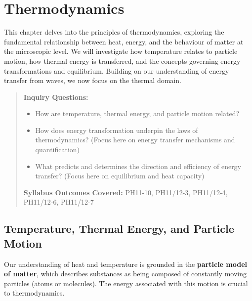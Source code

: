 
\chapter{Thermodynamics}
\label{ch:thermodynamics}
\FloatBarrier %

This chapter delves into the principles of thermodynamics, exploring the fundamental relationship between heat, energy, and the behaviour of matter at the microscopic level. We will investigate how temperature relates to particle motion, how thermal energy is transferred, and the concepts governing energy transformations and equilibrium. Building on our understanding of energy transfer from waves, we now focus on the thermal domain.

\blockquote{
\textbf{Inquiry Questions:}
\begin{itemize}
    \item How are temperature, thermal energy, and particle motion related?
    \item How does energy transformation underpin the laws of thermodynamics? (Focus here on energy transfer mechanisms and quantification)
    \item What predicts and determines the direction and efficiency of energy transfer? (Focus here on equilibrium and heat capacity)
\end{itemize}
\textbf{Syllabus Outcomes Covered:} PH11-10, PH11/12-3, PH11/12-4, PH11/12-6, PH11/12-7
}

\section{Temperature, Thermal Energy, and Particle Motion}
\label{sec:temp_energy_particle}
\FloatBarrier

Our understanding of heat and temperature is grounded in the \textbf{particle model of matter}, which describes substances as being composed of constantly moving particles (atoms or molecules). The energy associated with this motion is crucial to thermodynamics.


